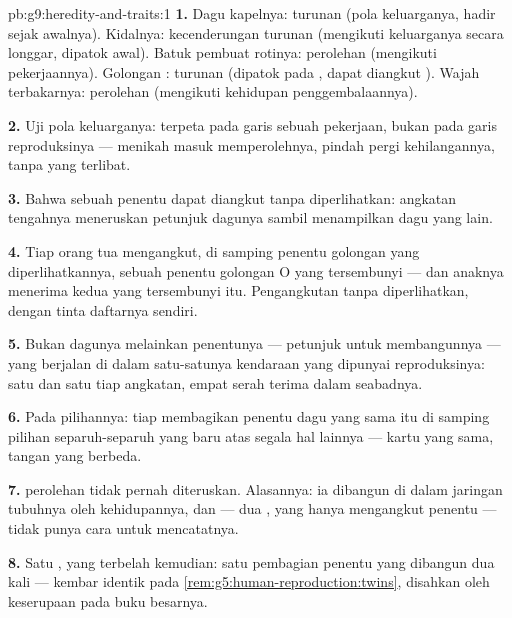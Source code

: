 \begin{solution}{pb:g9:heredity-and-traits:1}
\textbf{1.} Dagu kapelnya: turunan (pola keluarganya, hadir
sejak awalnya). Kidalnya: kecenderungan turunan (mengikuti
keluarganya secara longgar, dipatok awal). Batuk pembuat
rotinya: perolehan (mengikuti pekerjaannya). Golongan
: turunan (dipatok pada , dapat diangkut
). Wajah terbakarnya: perolehan (mengikuti kehidupan
penggembalaannya).

\textbf{2.} Uji pola keluarganya:  terpeta pada
garis sebuah pekerjaan, bukan pada garis reproduksinya ---
menikah masuk memperolehnya, pindah pergi kehilangannya,
tanpa  yang terlibat.

\textbf{3.} Bahwa sebuah penentu dapat diangkut tanpa
diperlihatkan: angkatan tengahnya meneruskan petunjuk
dagunya sambil menampilkan dagu yang lain.

\textbf{4.} Tiap orang tua mengangkut, di samping penentu
golongan yang diperlihatkannya, sebuah penentu golongan O
yang tersembunyi --- dan anaknya menerima kedua yang
tersembunyi itu. Pengangkutan tanpa diperlihatkan, dengan
tinta daftarnya sendiri.

\textbf{5.} Bukan dagunya melainkan penentunya --- petunjuk
untuk membangunnya --- yang berjalan di dalam satu-satunya
kendaraan yang dipunyai reproduksinya: satu  dan
satu  tiap angkatan, empat serah terima dalam
seabadnya.

\textbf{6.} Pada pilihannya: tiap  membagikan
penentu dagu yang sama itu di samping pilihan
separuh-separuh yang baru atas segala hal lainnya --- kartu
yang sama, tangan yang berbeda.

\textbf{7.}  perolehan tidak pernah diteruskan.
Alasannya: ia dibangun di dalam jaringan tubuhnya oleh
kehidupannya, dan  --- dua , yang hanya
mengangkut penentu --- tidak punya cara untuk mencatatnya.

\textbf{8.} Satu , yang terbelah kemudian: satu
pembagian penentu yang dibangun dua kali --- kembar identik
pada \cref{rem:g5:human-reproduction:twins}, disahkan oleh
keserupaan pada buku besarnya.


\end{solution}
